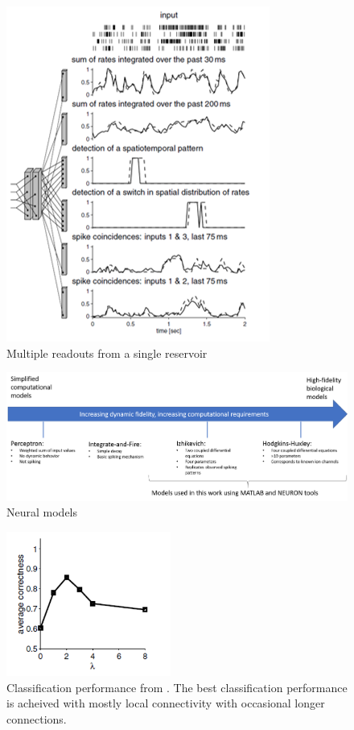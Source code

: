 \documentclass[a4paper,11pt]{article}
\begin{document}
\begin{figure}[p]
	\centering
	\includegraphics{fig/MultipleReadouts}
	\caption{Multiple readouts from a single reservoir \cite{maas2002}}
	\label{fig:lsm_multiple_readouts}
\end{figure}


\begin{figure}[p]
 \caption{Neural models}
 \centering
   \includegraphics[width=\textwidth]{fig/neural_models}
\end{figure}

\begin{figure}[p]
  \caption{Classification performance from \cite{maas2002}. The best classification performance is acheived with mostly local connectivity with occasional longer connections.}
  \label{fig:lambda_performance}
  \centering
    \includegraphics[width=0.48\textwidth]{fig/lambda_performance}
\end{figure}
\end{document}
